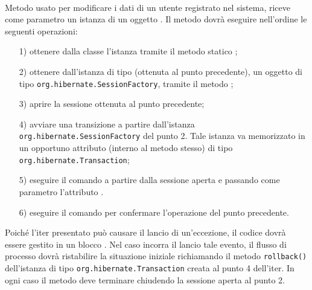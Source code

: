 \begin{description}
\item{}\\
	Metodo usato per modificare i dati di un utente registrato nel sistema, riceve come parametro un istanza di un oggetto . Il metodo dovrà eseguire nell'ordine le seguenti operazioni:
		\begin{itemize}
			\item[1)] ottenere dalla classe  l'istanza tramite il metodo statico ;
			\item[2)] ottenere dall'istanza di tipo (ottenuta al punto precedente), un oggetto di tipo \texttt{org.hibernate.SessionFactory}, tramite il metodo ;
			\item[3)] aprire la sessione ottenuta al punto precedente;
			\item[4)] avviare una transizione a partire dall'istanza \texttt{org.hibernate.SessionFactory} del punto 2. Tale istanza va memorizzato in un opportuno attributo (interno al metodo stesso) di tipo \texttt{org.hibernate.Transaction};
			\item[5)] eseguire il comando  a partire dalla sessione aperta e passando come parametro l'attributo .
			\item[6)] eseguire il comando  per confermare l'operazione del punto precedente.
		\end{itemize}
		
Poiché l'iter presentato può causare il lancio di un'eccezione, il codice dovrà essere gestito in un blocco . Nel caso incorra il lancio tale evento, il flusso di processo dovrà ristabilire la situazione iniziale richiamando il metodo \texttt{rollback()} dell'istanza di tipo \texttt{org.hibernate.Transaction} creata al punto 4 dell'iter. In ogni caso il metodo deve terminare chiudendo la sessione aperta al punto 2.


\end{description}
